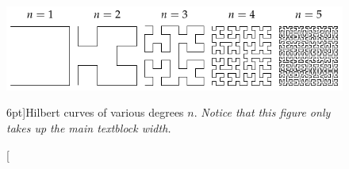 \begin{figure}
	\includegraphics{hilbertcurves.pdf}
	\caption[Hilbert curves of various degrees $n$.][6pt]{Hilbert curves of various degrees $n$. \emph{Notice that this figure only takes up the main textblock width.}}
	\label{fig:textfig}
\end{figure}

